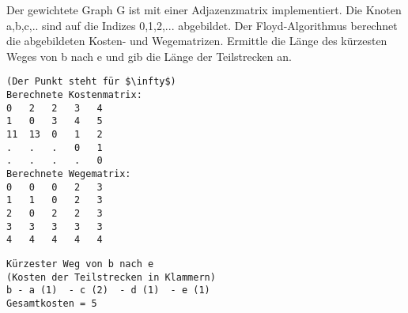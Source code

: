 ﻿\question[4]

Der gewichtete Graph G ist mit einer Adjazenzmatrix implementiert.
Die Knoten a,b,c,.. sind auf die Indizes 0,1,2,... abgebildet.
Der Floyd-Algorithmus berechnet die abgebildeten Kosten- und Wegematrizen.
Ermittle die Länge des kürzesten Weges von b nach e und gib die Länge der Teilstrecken an.
\begin{lstlisting}
(Der Punkt steht für $\infty$)
Berechnete Kostenmatrix:
0   2   2   3   4
1   0   3   4   5
11  13  0   1   2
.   .   .   0   1
.   .   .   .   0
Berechnete Wegematrix:
0   0   0   2   3
1   1   0   2   3
2   0   2   2   3
3   3   3   3   3
4   4   4   4   4
\end{lstlisting}

\begin{solutionbox}{3cm}

\begin{lstlisting}
Kürzester Weg von b nach e
(Kosten der Teilstrecken in Klammern)
b - a (1)  - c (2)  - d (1)  - e (1)
Gesamtkosten = 5
\end{lstlisting}
\end{solutionbox}
